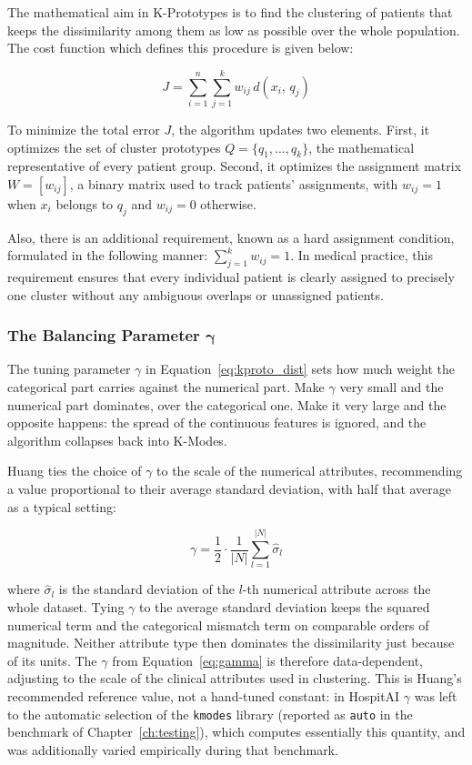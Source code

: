 The mathematical aim in K-Prototypes is to find the clustering of patients that keeps the dissimilarity among them as low as possible over the whole population. The cost function which defines this procedure is given below:

\begin{equation}
    J = \sum_{i=1}^{n} \sum_{j=1}^{k} w_{ij}\, d(x_i,\, q_j)
    \label{eq:kproto_obj}
\end{equation}

To minimize the total error $J$, the algorithm updates two elements. First, it optimizes the set of cluster prototypes $Q = \{q_1, \ldots, q_k\}$, the mathematical representative of every patient group. Second, it optimizes the assignment matrix $W = [w_{ij}]$, a binary matrix used to track patients' assignments, with $w_{ij}=1$ when $x_i$ belongs to $q_j$ and $w_{ij}=0$ otherwise.

Also, there is an additional requirement, known as a hard assignment condition, formulated in the following manner: $\sum_{j=1}^k w_{ij}=1$. In medical practice, this requirement ensures that every individual patient is clearly assigned to precisely one cluster without any ambiguous overlaps or unassigned patients.

\subsubsection*{The Balancing Parameter $\boldsymbol{\gamma}$}

The tuning parameter $\gamma$ in Equation~\ref{eq:kproto_dist} sets how much weight the categorical part carries against the numerical part. Make $\gamma$ very small and the numerical part dominates, over the categorical one. Make it very large and the opposite happens: the spread of the continuous features is ignored, and the algorithm collapses back into K-Modes.

Huang \cite{huang1998} ties the choice of $\gamma$ to the scale of the numerical attributes, recommending a value proportional to their average standard deviation, with half that average as a typical setting:

\begin{equation}
    \gamma = \frac{1}{2} \cdot \frac{1}{|N|} \sum_{l=1}^{|N|} \hat{\sigma}_l
    \label{eq:gamma}
\end{equation}

where $\hat{\sigma}_l$ is the standard deviation of the $l$-th numerical attribute across the whole dataset. Tying $\gamma$ to the average standard deviation keeps the squared numerical term and the categorical mismatch term on comparable orders of magnitude. Neither attribute type then dominates the dissimilarity just because of its units. The $\gamma$ from Equation~\eqref{eq:gamma} is therefore data-dependent, adjusting to the scale of the clinical attributes used in clustering. This is Huang's recommended reference value, not a hand-tuned constant: in HospitAI $\gamma$ was left to the automatic selection of the \texttt{kmodes} library (reported as \texttt{auto} in the benchmark of Chapter~\ref{ch:testing}), which computes essentially this quantity, and was additionally varied empirically during that benchmark.

